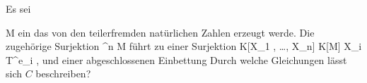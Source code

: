 \setcounter{section}{19}







Es sei

\mavergleichskette
{\vergleichskette
{ M
}
{ \subseteq }{ \N
}
{  }{
}
{    }{
}
{   }{
}
}
{}{}{}
ein
das von den teilerfremden natürlichen Zahlen
 erzeugt werde. Die zugehörige Surjektion
\maabb {} { \N^n } { M \subseteq \N
} {}
führt zu einer Surjektion
\maabbeledisp {} { K[X_1  , \ldots , X_n] } { K[M]
} { X_i } { T^{e_i}} {,}
und einer abgeschlossenen Einbettung
 Durch welche Gleichungen lässt sich $C$ beschreiben?





